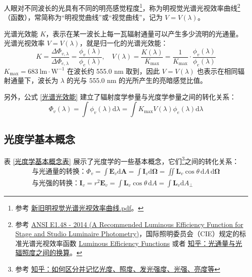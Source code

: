 \documentclass[UTF8]{report}
\theoremstyle{MyLineTheoremStyle} %
\theoremstyle{MyBlockTheoremStyle} %
\theoremstyle{MySubsubsectionStyle} %
\begin{document}
人眼对不同波长的光具有不同的明亮感觉程度\footnote{参考 \href{https://www.writebug.com/static/uploads/2024/9/16/09153f4fce1d2b99e38c19ef9deeda44.pdf}{新旧明视觉光谱光视效率曲线.pdf}。}，称为明视觉光谱光视效率曲线\footnote{参考 \href{https://webstore.ansi.org/preview-pages/ESTA/preview_E1-48_2014.pdf}{ANSI E1.48 - 2014 (A Recommended Luminous Efficiency Function for Stage and Studio Luminaire Photometry)}，国际照明委员会（CIE）规定的标准光谱光视效率函数 \href{https://rdrr.io/cran/colorSpec/man/luminsivity.html}{Luminous Efficiency Functions} 或者 \href{https://www.zhihu.com/question/400643965/answer/2727547334}{知乎：光通量与光辐照度之间的换算}。}（函数），常简称为“明视觉曲线”或“视觉曲线”，记为 $V = V(\lambda)$。

光谱光效能 $K$，表示在某一波长上每一瓦辐射通量可以产生多少流明的光通量。光谱光视效率 $V = V(\lambda)$，就是归一化的光谱光效能：
\begin{equation}\label{光谱光效能}
    K = \frac{\Delta \Phi_{v,\lambda}}{\Delta \Phi_{e,\lambda}} = \frac{\phi_v(\lambda)}{\phi_e(\lambda)}, \quad V(\lambda) = \frac{K(\lambda)}{K_{\text{max}}} = \frac{1}{K_{\text{max}}}\cdot \frac{\phi_v(\lambda)}{\phi_e(\lambda)}
\end{equation}
$K_{\text{max}} = 683\ \mathrm{lm \cdot W^{-1}}$ 在波长约 555.0 nm 取到，因此 $V = V(\lambda)$ 也表示在相同辐射通量下，波长为 $\lambda$ 的光与 555.0 nm 的光所产生的亮暗感觉比值。

另外，公式 \ref{光谱光效能} 建立了辐射度学参量与光度学参量之间的转化关系：
\begin{equation}
\Phi_v(\lambda) 
= \int \phi_v(\lambda) \mathrm{d} \lambda 
= \int K_{\text{max}}V(\lambda)\phi_e(\lambda) \mathrm{d} \lambda  
\end{equation}

\subsection{光度学基本概念}\label{光度学基本概念}
表 \ref{光度学基本概念表} 展示了光度学的一些基本概念，它们\footnote{参考 \href{https://www.zhihu.com/question/53080536/answer/133398317}{知乎：如何区分并记忆光度、照度、发光强度、光强、亮度等}}之间的转化关系：
\begin{gather}
\text{与光通量的转换：} \Phi_v = \int \boldsymbol{E}_v \mathrm{d}\boldsymbol{A} = \int \boldsymbol{I}_v \mathrm{d}\boldsymbol{\Omega} = \iint \boldsymbol{L}_v \cos \theta\, \mathrm{d}A \,\mathrm{d} \boldsymbol{\Omega} \\ 
\text{与光强的转换：} \boldsymbol{I}_v = r^2\boldsymbol{E}_v = \int \boldsymbol{L}_v \cos \theta\, \mathrm{d}A = \int \boldsymbol{L}_v  \mathrm{d}A_{\perp}
\end{gather}
\end{document}

